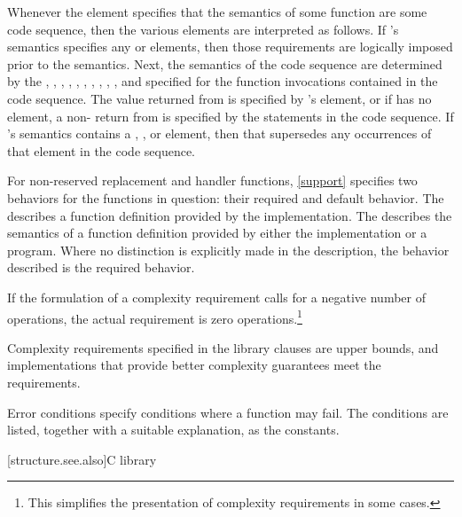 \pnum
Whenever the  element specifies that the semantics of some function
 are  some code sequence, then the various elements are
interpreted as follows.
If 's semantics specifies any  or  elements,
then those requirements are logically imposed prior to the  semantics.
Next, the semantics of the code sequence are determined by the
, , , ,
, , , ,
, , and 
specified for the function invocations contained in the code sequence.
The value returned from  is specified by 's  element,
or if  has no  element,
a non- return from  is specified by the
 statements in the code sequence.
If 's semantics contains a ,
, or  element,
then that supersedes any occurrences of that element in the code sequence.

\pnum
For non-reserved replacement and handler functions,
\ref{support} specifies two behaviors for the functions in question:
their required and default behavior.
The 
describes a function definition provided by the implementation.
The 
describes the semantics of a function definition provided by
either the implementation or a \Cpp{} program.
Where no distinction is explicitly made in the description, the
behavior described is the required behavior.

\pnum
If the formulation of a complexity requirement calls for a negative number of
operations, the actual requirement is zero operations.\footnote{This simplifies
the presentation of complexity requirements in some cases.}

\pnum
Complexity requirements specified in the library clauses are upper bounds,
and implementations that provide better complexity guarantees meet
the requirements.

\pnum
Error conditions specify conditions where a function may fail. The conditions
are listed, together with a suitable explanation, as the 
constants.

[structure.see.also]{C library}

